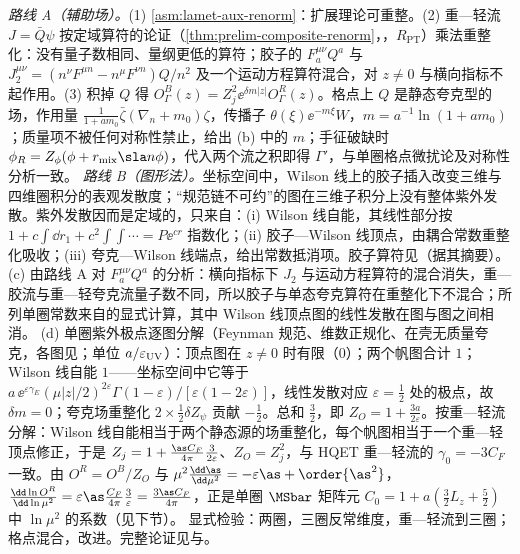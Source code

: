 \begin{proofsketch}
\emph{路线 A（辅助场\cite{Ji:2017oey,Green:2017xeu}）。}(1) \cref{asm:lamet-aux-renorm}：扩展理论可重整。(2) 重—轻流 $J=\bar Q\psi$ 按定域算符的论证（\cref{thm:prelim-composite-renorm}，\tagR，$R_{\mathrm{PT}}$）乘法重整化：没有量子数相同、量纲更低的算符；胶子的 $F^{\mu\nu}_aQ^a$ 与 $J_2^{\mu\nu}=(n^\nu F^{\mu n}-n^\mu F^{\nu n})Q/n^2$ 及一个运动方程算符混合\cite{Dorn:1986dt}，对 $z\neq0$ 与横向指标不起作用。(3) 积掉 $Q$ 得 $O^B_\Gamma(z)=Z_j^2\ee^{\delta m|z|}O^R_\Gamma(z)$。格点上 $Q$ 是静态夸克型的场，作用量 $\frac1{1+am_0}\bar\zeta(\nabla_n+m_0)\zeta$，传播子 $\theta(\xi)\ee^{-m\xi}W$，$m=a^{-1}\ln(1+am_0)$；质量项不被任何对称性禁止，给出 (b) 中的 $m$；手征破缺时 $\phi_R=Z_\phi(\phi+r_{\rm mix}\sla n\phi)$，代入两个流之积即得 $\Gamma'$\cite{Green:2017xeu}，与单圈格点微扰论\cite{Constantinou:2017sej}及对称性分析\cite{Chen:2017mie}一致。
\emph{路线 B（图形法\cite{Ishikawa:2017faj}）。}坐标空间中，Wilson 线上的胶子插入改变三维与四维圈积分的表观发散度；“规范链不可约”的图在三维子积分上没有整体紫外发散。紫外发散因而是定域的，只来自：(i) Wilson 线自能，其线性部分按 $1+c\int\dd r_1+c^2\int\!\!\int\cdots=P\ee^{cr}$ 指数化；(ii) 胶子—Wilson 线顶点，由耦合常数重整化吸收\cite{Dotsenko:1979wb}；(iii) 夸克—Wilson 线端点，给出常数抵消项。胶子算符见\cite{Li:2018tpe,Zhang:2018diq}（据其摘要）。
(c) 由路线 A 对 $F^{\mu\nu}_aQ^a$ 的分析：横向指标下 $J_2$ 与运动方程算符的混合消失，重—胶流与重—轻夸克流量子数不同，所以胶子与单态夸克算符在重整化下不混合\cite{JiEtAl2021,Zhang:2018diq}；所列单圈常数来自\cite[第~III.A~节]{JiEtAl2021}的显式计算，其中 Wilson 线顶点图的线性发散在图与图之间相消。
(d) 单圈紫外极点逐图分解（Feynman 规范、维数正规化、在壳无质量夸克，各图见\cite[第~III~节]{IzubuchiEtAl2018}；单位 $a/\varepsilon_{\rm UV}$）：顶点图在 $z\neq0$ 时有限（$0$）；两个帆图合计 $1$；Wilson 线自能 $1$——坐标空间中它等于 $a\,\ee^{\varepsilon\gamma_E}(\mu|z|/2)^{2\varepsilon}\Gamma(1-\varepsilon)/[\varepsilon(1-2\varepsilon)]$，线性发散对应 $\varepsilon=\frac12$ 处的极点，故 $\delta m=0$；夸克场重整化 $2\times\frac12\delta Z_\psi$ 贡献 $-\frac12$。总和 $\frac32$，即 $Z_O=1+\frac{3a}{2\varepsilon}$。按重—轻流分解：Wilson 线自能相当于两个静态源的场重整化，每个帆图相当于一个重—轻顶点修正，于是 $Z_j=1+\frac{\as C_F}{4\pi}\frac3{2\varepsilon}$、$Z_O=Z_j^2$，与 HQET 重—轻流的 $\gamma_0=-3C_F$ 一致。由 $O^R=O^B/Z_O$ 与 $\mu^2\frac{\dd\as}{\dd\mu^2}=-\varepsilon\as+\order{\as^2}$，$\frac{\dd\ln O^R}{\dd\ln\mu^2}=\varepsilon\as\frac{C_F}{4\pi}\frac3\varepsilon=\frac{3\as C_F}{4\pi}$，正是单圈 $\MSbar$ 矩阵元 $C_0=1+a(\frac32L_z+\frac52)$ 中 $\ln\mu^2$ 的系数（见下节）。
显式检验：两圈\cite{Ji:2015jwa}，三圈反常维度\cite{Braun:2020ymy}，重—轻流到三圈\cite{Chetyrkin:2003vi}；格点混合\cite{Constantinou:2017sej,Chen:2017mie}，改进\cite{Green:2020xco}。完整论证见\cite{Ji:2017oey,Ishikawa:2017faj}与\cite[第~III.A~节]{JiEtAl2021}。
\end{proofsketch}

